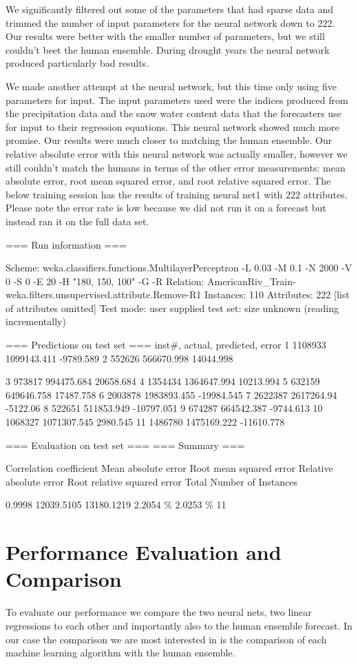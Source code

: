 \documentclass[conference]{IEEEtran}
\begin{document}
We significantly filtered out some of the parameters that had sparse data and
trimmed the number of input parameters for the neural network down to 222. Our
results were better with the smaller number of parameters, but we still couldn’t
beet the human ensemble. During drought years the neural network produced
particularly bad results.

We made another attempt at the neural network, but this time only using five
parameters for input. The input parameters used were the indices produced from
the precipitation data and the snow water content data that the forecasters use
for input to their regression equations. This neural network showed much more
promise. Our results were much closer to matching the human ensemble. Our
relative absolute error with this neural network was actually smaller, however we
still couldn’t match the humans in terms of the other error measurements: mean
absolute error, root mean squared error, and root relative squared error.
The below training session has the results of training neural net1 with 222
attributes. Please note the error rate is low because we did not run it on a
forecast but instead ran it on the full data set.

=== Run information ===

Scheme:
weka.classifiers.functions.MultilayerPerceptron -L 0.03 -M 0.1 -N
2000 -V 0 -S 0 -E 20 -H "180, 150, 100" -G -R
Relation: AmericanRiv\_Train-weka.filters.unsupervised.attribute.Remove-R1
Instances: 110
Attributes: 222
[list of attributes omitted]
Test mode: user supplied test set: size unknown (reading incrementally)

=== Predictions on test set ===
inst\#, actual, predicted, error
1 1108933 1099143.411 -9789.589
2 552626 566670.998 14044.998

3 973817 994475.684 20658.684
4 1354434 1364647.994 10213.994
5 632159 649646.758 17487.758
6 2003878 1983893.455 -19984.545
7 2622387 2617264.94 -5122.06
8 522651 511853.949 -10797.051
9 674287 664542.387 -9744.613
10 1068327 1071307.545 2980.545
11 1486780 1475169.222 -11610.778

=== Evaluation on test set ===
=== Summary ===

Correlation coefficient
Mean absolute error
Root mean squared error
Relative absolute error
Root relative squared error
Total Number of Instances

0.9998
12039.5105
13180.1219
2.2054 \%
2.0253 \%
11

\section{Performance Evaluation and Comparison}
To evaluate our performance we compare the two neural nets, two linear
regressions to each other and importantly also to the human ensemble forecast.
In our case the comparison we are most interested in is the comparison of each
machine learning algorithm with the human ensemble.
\end{document}
